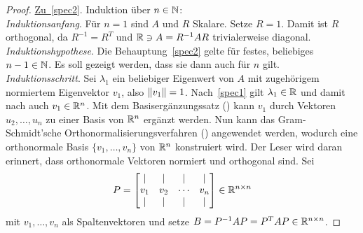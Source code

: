 \begin{proof}
    \underline{Zu~\ref{spec2}}. Induktion über \(n \in \mathbb{N}\): \\
    \textit{Induktionsanfang}. 
    Für \(n=1\) sind \(A\) und \(R\) Skalare. 
    Setze \(R=1\). 
    Damit ist \(R\) orthogonal, da \(R^{-1}=R^{T}\) und \(\mathbb{R} \ni A = R^{-1}AR\) trivialerweise diagonal. \\
    \textit{Induktionshypothese}. 
    Die Behauptung~\ref{spec2} gelte für festes, beliebiges \(n-1 \in \mathbb{N}\). 
    Es soll gezeigt werden, dass sie dann auch für \(n\) gilt.  \\
    \textit{Induktionsschritt}.  
    Sei \(\lambda_1\) ein beliebiger Eigenwert von \(A\) mit zugehörigem normiertem Eigenvektor \(v_1\), also \(\lVert v_1\rVert = 1\).  
    Nach~\ref{spec1} gilt \(\lambda_1 \in \mathbb{R}\) und damit nach  auch \(v_1 \in \mathbb{R}^{n}\). 
    Mit dem Basisergänzungssatz () kann \(v_1\) durch Vektoren \(u_2,\ldots,u_n\) zu einer Basis von \(\mathbb{R}^{n}\) ergänzt werden. 
    Nun kann das Gram-Schmidt’sche Orthonormalisierungsverfahren () angewendet werden, wodurch eine orthonormale Basis \(\{v_1,\ldots,v_n\}\) von \(\mathbb{R}^{n}\) konstruiert wird.  
    Der Leser wird daran erinnert, dass orthonormale Vektoren normiert und orthogonal sind.
    Sei 
    \begin{equation*}
        P = 
        \begin{bmatrix}
            \vert & \vert & \vert & \vert\\
            v_1 & v_2 & \cdots & v_n \\
            \vert & \vert & \vert & \vert
        \end{bmatrix} 
        \in \mathbb{R} ^{n \times n}
    \end{equation*} 
    mit \(v_1,\ldots,v_n\) als Spaltenvektoren und setze \(B = P^{-1}AP = P^{T}AP \in \mathbb{R}^{n \times n}\).


\end{proof}
